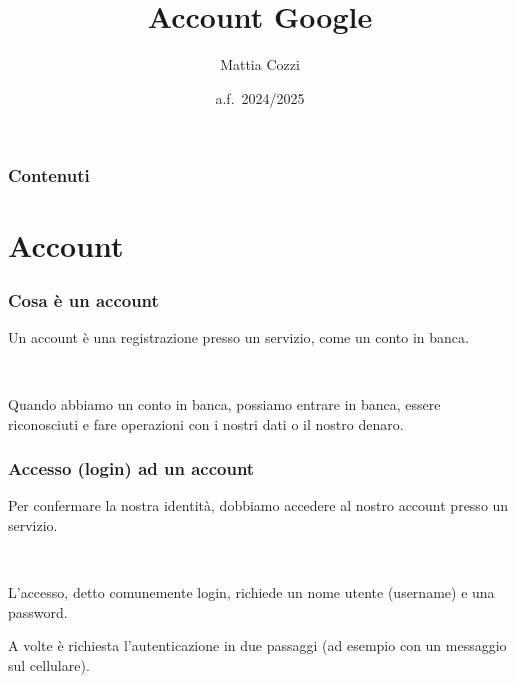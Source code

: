 \documentclass[]{beamer}
\title{Account Google}
\author{Mattia Cozzi}
\date{a.f.~2024/2025}
\begin{document}
\begin{frame}
  \titlepage
\end{frame}


\begin{frame}
\frametitle{Contenuti}
\tableofcontents
\end{frame}



\section{Account}


\begin{frame}
\frametitle{Cosa è un account}
Un account è una \alert{registrazione presso un servizio}, come un conto in banca.\pause

~

Quando abbiamo un conto in banca, possiamo entrare in banca, essere riconosciuti e fare operazioni con i nostri dati o il nostro denaro.

\end{frame}




\begin{frame}
\frametitle{Accesso (login) ad un account}
Per confermare la nostra identità, dobbiamo \alert{accedere al nostro account} presso un servizio.\pause

~

L'accesso, detto comunemente \alert{login}, richiede un \alert{nome utente (username)} e una \alert{password}.

A volte è richiesta l'autenticazione in due passaggi (ad esempio con un messaggio sul cellulare).

\end{frame}
\end{document}
